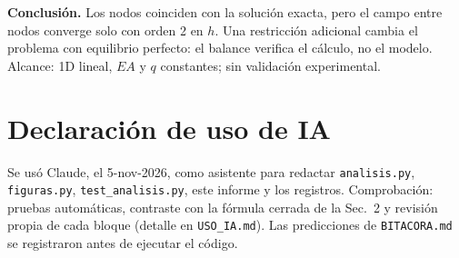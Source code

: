 \documentclass[11pt]{article}
\begin{document}
\textbf{Conclusión.} Los nodos coinciden con la solución exacta, pero el campo entre nodos converge solo con orden 2 en $h$. Una restricción adicional cambia el problema con equilibrio perfecto: el balance verifica el cálculo, no el modelo. Alcance: 1D lineal, $EA$ y $q$ constantes; sin validación experimental.

\section*{Declaración de uso de IA}
Se usó Claude, el 5-nov-2026, como asistente para redactar \texttt{analisis.py}, \texttt{figuras.py}, \texttt{test\_analisis.py}, este informe y los registros. Comprobación: pruebas automáticas, contraste con la fórmula cerrada de la Sec.~2 y revisión propia de cada bloque (detalle en \texttt{USO\_IA.md}). Las predicciones de \texttt{BITACORA.md} se registraron antes de ejecutar el código.



\end{document}
